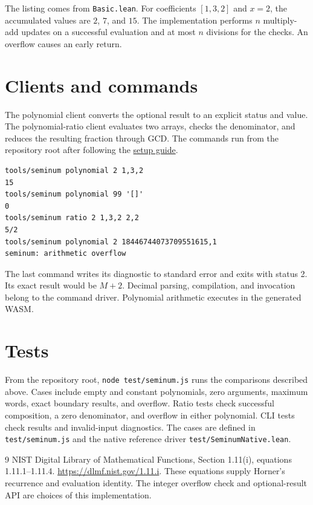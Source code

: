 

The listing comes from \texttt{Basic.lean}.  For coefficients $[1,3,2]$
and $x=2$, the accumulated values are $2$, $7$, and $15$.  The implementation
performs $n$ multiply-add updates on a successful evaluation and at most $n$
divisions for the checks.  An overflow causes an early return.

\section{Clients and commands}
The polynomial client converts the optional result to an explicit status and
value.  The polynomial-ratio client evaluates two arrays, checks the denominator,
and reduces the resulting fraction through GCD.  The commands run from the
repository root after following the
\href{https://github.com/jsmorph/leanexe/blob/lib1/DEVELOPING.md}{setup guide}.

\begin{lstlisting}
tools/seminum polynomial 2 1,3,2
15
tools/seminum polynomial 99 '[]'
0
tools/seminum ratio 2 1,3,2 2,2
5/2
tools/seminum polynomial 2 18446744073709551615,1
seminum: arithmetic overflow
\end{lstlisting}

The last command writes its diagnostic to standard error and exits with
status 2.  Its exact result would be $M+2$.  Decimal parsing, compilation,
and invocation belong to the command driver.  Polynomial arithmetic executes
in the generated WASM.

\section{Tests}
From the repository root, \texttt{node test/seminum.js} runs the comparisons
described above.  Cases include empty and constant polynomials, zero arguments,
maximum words, exact boundary results, and overflow.  Ratio tests check
successful composition, a zero denominator, and overflow in either polynomial.
CLI tests check results and invalid-input diagnostics.  The cases are defined
in \texttt{test/seminum.js} and the native reference driver
\texttt{test/SeminumNative.lean}.

\begin{thebibliography}{9}
 NIST Digital Library of Mathematical Functions,
Section 1.11(i), equations 1.11.1--1.11.4.
\url{https://dlmf.nist.gov/1.11.i}.
These equations supply Horner's recurrence and evaluation identity.
The integer overflow check and optional-result API are choices of this
implementation.
\end{thebibliography}

